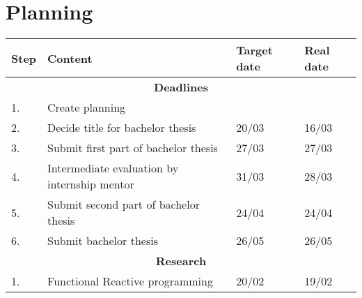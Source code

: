 
\chapter{Planning} %
\label{sec:actieplan}

\begin{longtable}{|l|l|l|l|}
	\hline
	\textbf{Step} & \textbf{Content}                                                                                                                                 & \textbf{Target date} & \textbf{Real date} \\ \hline
	\multicolumn{4}{|c|}{\textbf{Deadlines}}                                                                                                                                                                     \\ \hline
	1.            & Create planning & &          \\ \hline
	2.            & Decide title for bachelor thesis                                                                                                                 & 20/03                & 16/03              \\ \hline
	3.            & Submit first part of bachelor thesis                                                                                                             & 27/03                & 27/03              \\ \hline
	4.            & Intermediate evaluation by internship mentor                                                                                                     & 31/03                & 28/03                   \\ \hline
	5.            & Submit second part of bachelor thesis                                                                                                            & 24/04                &  24/04                  \\ \hline
	6.            & Submit bachelor thesis                                                                                                                           & 26/05                & 26/05                   \\ \hline
	\multicolumn{4}{|c|}{\textbf{Research}}                                                                                                                                                                      \\ \hline
	1.            & Functional Reactive programming                                                                                                                  & 20/02                & 19/02              \\ \hline

\end{longtable}

